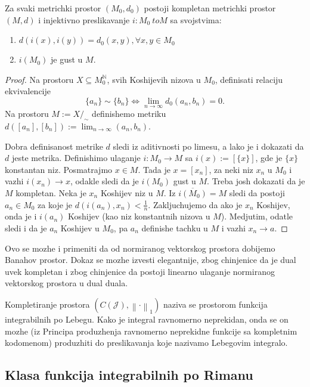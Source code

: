 \documentclass[a4paper,12pt]{article}
\newcommand{\NN}{\mathbb{N}}
\newcommand{\psj}{\subseteq}
\newcommand{\ds}{\displaystyle}
\newcommand{\norm}[1]{\left\lVert#1\right\rVert}
\begin{document}
\begin{tma}
	Za svaki metrichki prostor $(M_0, d_0)$ postoji kompletan metrichki prostor
	$(M,d)$ i in\-jektivno preslikavanje $i:M_0 \ to M$ sa svojstvima:
	\begin{enumerate}
		\item $d(i(x), i(y)) = d_0(x, y), \forall x, y \in M_0$
		\item $i(M_0)$ je gust u $M$.
	\end{enumerate}
\end{tma}
\begin{proof}
	Na prostoru $X\psj M_0^\NN$, svih Koshijevih nizova u $M_0$, definisati relaciju ekviva\-lencije
	\[ \{a_n\} \sim \{b_n\} \iff \lim_{n\to \infty} d_0(a_n, b_n) = 0 .\] 
	Na prostoru $M:= X/_\sim$ definishemo metriku $\ds{d([a_n], [b_n]):= \lim_{n\to \infty} (a_n, b_n)}$.

	Dobra definisanost metrike $d$ sledi iz aditivnosti po limesu, a lako je i dokazati da $d$ jeste metrika.
	Definishimo ulaganje $i:M_0 \to M$ sa $i(x) := [\{x\}]$, gde je $\{x\}$ konstantan niz. Posmatrajmo $x \in M$.
	Tada je $x = [x_n]$, za neki niz $x_n$ u $M_0$ i vazhi $i(x_n) \to x$, odakle sledi da je $i(M_0)$ gust u $M$.
	Treba josh dokazati da je $M$ kompletan. Neka je $x_n$ Koshijev niz u $M$. Iz $\overline{i(M_0)} = M$ sledi 
	da postoji $a_n \in M_0$ za koje je $d(i(a_n), x_n) < \frac{1}{n}$. Zakljuchujemo da ako je $x_n$ Koshijev,
	onda je i $i(a_n)$ Koshijev (kao niz konstantnih nizova u $M$). Medjutim, odatle sledi i da je $a_n$ Koshijev
	u $M_0$, pa $a_n$ definishe tachku u $M$ i vazhi $x_n \to a$.
\end{proof}

\begin{nap}
	Ovo se mozhe i primeniti da od normiranog vektorskog prostora dobijemo Banahov prostor. Dokaz 
	se mozhe izvesti elegantnije, zbog chinjenice da je dual uvek kompletan i zbog chinjenice 
	da postoji linearno ulaganje normiranog vektorskog prostora u dual duala.
\end{nap}

\begin{posl}
	Kompletiranje prostora $(C(\mathcal J), \norm{\cdot}_1)$ naziva se prostorom funkcija inte\-grabilnih po Lebegu. 
	Kako je integral ravnomerno neprekidan, onda se on mozhe (iz Principa produzhenja ravnomerno neprekidne funkcije
	sa kompletnim kodomenom) pro\-duzhiti do preslikavanja koje nazivamo Lebegovim integralo.
\end{posl}

\subsection{Klasa funkcija integrabilnih po Rimanu}
\end{document}

